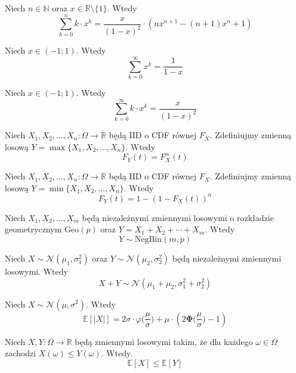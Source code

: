\begin{fact}\label{F:geo_1}
Niech $n\in\mathbb{N}$ oraz $x\in\mathbb{R}\setminus\{1\}$. Wtedy
\[
    \sum_{k=0}^{n} k\cdot x^k=\frac{x}{(1-x)^2}\cdot (nx^{n+1}-(n+1)x^n+1)
\]
\end{fact}

\begin{fact}\label{F:geo_0_inf}
Niech $x\in (-1;1)$. Wtedy
\[
    \sum_{k=0}^{\infty} x^k = \frac{1}{1-x}
\]
\end{fact}

\begin{fact}\label{F:geo_1_inf}
Niech $x\in (-1;1)$. Wtedy
\[
    \sum_{k=0}^{\infty} k\cdot x^k=\frac{x}{(1-x)^2}
\]
\end{fact}

\begin{fact}\label{F:max_CDF}
Niech $X_1,X_2,\dots, X_n:\Omega\to\mathbb{R}$ będą IID o CDF równej $F_X$. Zdefiniujmy zmienną losową $Y = \max\{X_1,X_2,\dots, X_n\}$. Wtedy 
\[
    F_Y(t)=F_X^n(t)
\]
\end{fact}

\begin{fact}\label{F:min_CDF}
Niech $X_1,X_2,\dots, X_n:\Omega\to\mathbb{R}$ będą IID o CDF równej $F_X$. Zdefiniujmy zmienną losową $Y = \min\{X_1,X_2,\dots, X_n\}$. Wtedy 
\[
    F_Y(t)=1-(1-F_X(t))^n
\]
\end{fact}

\begin{fact}\label{F:sum_of_geo_RV}
Niech $X_1, X_2, \dots, X_m$ będą niezależnymi zmiennymi losowymi o rozkładzie geometrycznym $\mathrm{Geo}(p)$ oraz $Y=X_1 + X_2 + \cdots + X_m$. Wtedy 
\[
    Y \sim \mathrm{NegBin}(m, p)
\]
\end{fact}

\begin{fact}\label{F:sum_of_normal_RV}
Niech $X \sim \mathcal{N}(\mu_1,\sigma_1^2)$ oraz $Y \sim \mathcal{N}(\mu_2,\sigma_2^2)$ będą niezależnymi zmiennymi losowymi. Wtedy 
\[
    X + Y \sim \mathcal{N}(\mu_1+\mu_2,\sigma_1^2+\sigma_2^2)
\]
\end{fact}

\begin{fact}\label{F:E_abs_normal}
Niech $X \sim \mathcal{N}(\mu,\sigma^2)$. Wtedy
\[
    \mathbb{E}[|X|] = 2\sigma\cdot \varphi\Big(\frac{\mu}{\sigma}\Big)+\mu\cdot (2\mathbf{\Phi}\Big(\frac{\mu}{\sigma}\Big)-1)
\]
\end{fact}

\begin{fact}\label{F:montonicity_of_expectation}
Niech $X,Y:\Omega\to\mathbb{R}$ będą zmiennymi losowymi takim, że dla każdego $\omega\in\Omega$ zachodzi $X(\omega)\le Y(\omega)$. Wtedy. 
\[
    \mathbb{E}[X] \le \mathbb{E}[Y]
\]
\end{fact}

